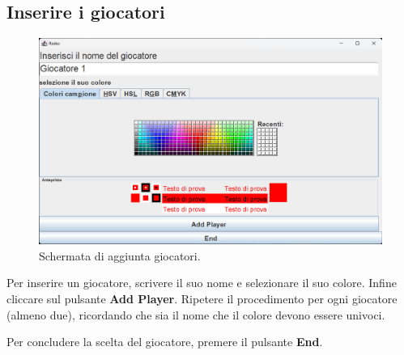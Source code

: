 \documentclass[a4paper,12pt]{report}
\begin{document}
\subsection{Inserire i giocatori}
\begin{figure}[H]
	\centering
	\includegraphics[width=1\textwidth]{user_guide/1_add_player.png}
	\caption{Schermata di aggiunta giocatori.}
\end{figure}
Per inserire un giocatore, scrivere il suo nome e selezionare il suo colore. Infine cliccare sul pulsante \textbf{Add Player}.
Ripetere il procedimento per ogni giocatore (almeno due), ricordando che sia il nome che il colore devono essere univoci.

Per concludere la scelta del giocatore, premere il pulsante \textbf{End}.
\end{document}
